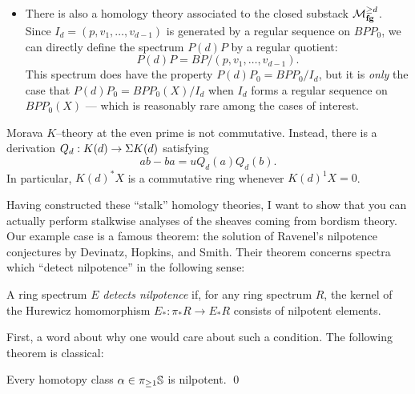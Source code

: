 \begin{definition}
\begin{itemize}
\item There is also a homology theory associated to the closed substack $\moduli{fg}^{\ge d}$.  Since $I_d = (p, v_1, \ldots, v_{d-1})$ is generated by a regular sequence on $BPP_0$, we can directly define the spectrum $P(d)P$ by a regular quotient: \[P(d)P = BP / (p, v_1, \ldots, v_{d-1}).\]  This spectrum does have the property $P(d)P_0 = BPP_0 / I_d$, but it is \emph{only} the case that $P(d)P_0 = BPP_0(X) / I_d$ when $I_d$ forms a regular sequence on $BPP_0(X)$ --- which is reasonably rare among the cases of interest.
\end{itemize}
\end{definition}

\begin{remark}  
Morava $K$--theory at the even prime is not commutative.  Instead, there is a derivation $Q_d: K(d) \to \Susp K(d)$ satisfying \[ab - ba = u Q_d(a) Q_d(b).\]  In particular, $K(d)^* X$ is a commutative ring whenever $K(d)^1 X = 0$.
\end{remark}

Having constructed these ``stalk'' homology theories, I want to show that you can actually perform stalkwise analyses of the sheaves coming from bordism theory.  Our example case is a famous theorem: the solution of Ravenel's nilpotence conjectures by Devinatz, Hopkins, and Smith.  Their theorem concerns spectra which ``detect nilpotence'' in the following sense:


\begin{definition}
A ring spectrum $E$ \textit{detects nilpotence} if, for any ring spectrum $R$, the kernel of the Hurewicz homomorphism $E_*: \pi_* R \to E_* R$ consists of nilpotent elements.
\end{definition}

First, a word about why one would care about such a condition.  The following theorem is classical:
\begin{theorem}[Nishida]
Every homotopy class $\alpha \in \pi_{\ge 1} \S$ is nilpotent. \qed
\end{theorem}

